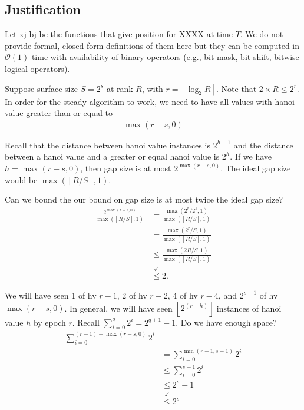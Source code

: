 




\subsection{Justification}

Let xj bj be the functions that give position for XXXX at time $T$.
We do not provide formal, closed-form definitions of them here but they can be computed in $\mathcal{O}(1)$ time with availability of binary operators (e.g., bit mask, bit shift, bitwise logical operators).


Suppose surface size $S = 2^s$ at rank $R$, with $r = \left\lceil \log_2 R \right\rceil$.
Note that $2 \times R \leq 2^r$.
In order for the steady algorithm to work, we need to have all values with hanoi value greater than or equal to
\begin{align*}
\max(r - s, 0)
\end{align*}

Recall that the distance between hanoi value instances is $2^{h + 1}$ and the distance between a hanoi value and a greater or equal hanoi value is $2^h$.
If we have $h = \max (r - s, 0)$, then gap size is at most $2^{\max(r - s, 0)}$.
The ideal gap size would be $\max( \left\lceil R / S \right\rceil, 1)$.

Can we bound the our bound on gap size is at most twice the ideal gap size?
\begin{align*}
\frac{
  2^{\max(r - s, 0)}
}{
  \max(\left\lceil R / S \right\rceil, 1)
}
&=
\frac{
  \max(2^r / 2^s, 1)
}{
  \max(\left\lceil R / S \right\rceil, 1)
} \\
&=
\frac{
  \max(2^r / S, 1)
}{
  \max(\left\lceil R / S \right\rceil, 1)
} \\
&\leq
\frac{
  \max(2R / S, 1)
}{
  \max(\left\lceil R / S \right\rceil, 1)
} \\
&\stackrel{\checkmark}{\leq} 2.
\end{align*}

We will have seen 1 of hv $r - 1$, 2 of hv $r - 2$, 4 of hv $r - 4$, and $2 ^ {s - 1}$ of hv $\max(r - s, 0)$.
In general, we will have seen $\left\lfloor 2 ^ (r - h) \right\rfloor$ instances of hanoi value $h$ by epoch $r$.
Recall $\sum_{i = 0}^{q} 2^i = 2 ^ {q + 1} - 1$.
Do we have enough space?
\begin{align*}
\sum_{i = 0}^{(r - 1) - \max(r - s, 0)} 2 ^ i \\
&= \sum_{i = 0}^{\min(r - 1, s - 1)} 2 ^ i \\
&\leq \sum_{i = 0}^{s - 1} 2 ^ i \\
&\leq 2^s - 1\\
&\stackrel{\checkmark}{\leq} 2^s
\end{align*}


